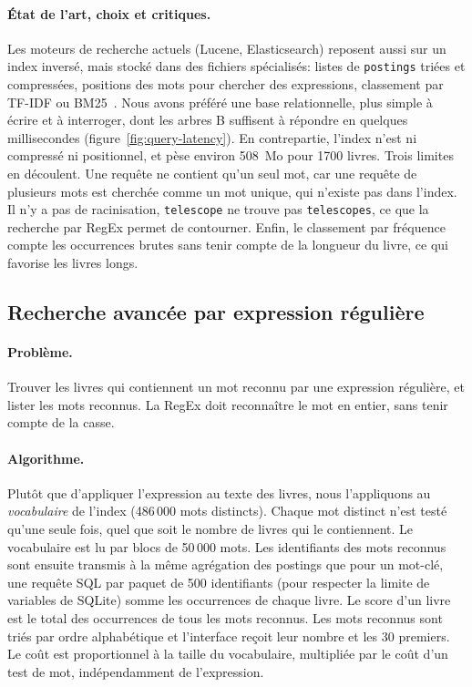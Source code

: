 \documentclass[11pt,a4paper]{article}
\begin{document}
\paragraph{État de l'art, choix et critiques.}
Les moteurs de recherche actuels (Lucene, Elasticsearch) reposent aussi sur un index inversé, mais stocké dans des fichiers spécialisés: listes de \texttt{postings} triées et compressées, positions des mots pour chercher des expressions, classement par TF-IDF ou BM25~\cite{iir}. Nous avons préféré une base relationnelle, plus simple à écrire et à interroger, dont les arbres B suffisent à répondre en quelques millisecondes (figure~\ref{fig:query-latency}). En contrepartie, l'index n'est ni compressé ni positionnel, et pèse environ 508~Mo pour 1700 livres. Trois limites en découlent. Une requête ne contient qu'un seul mot, car une requête de plusieurs mots est cherchée comme un mot unique, qui n'existe pas dans l'index. Il n'y a pas de racinisation, \texttt{telescope} ne trouve pas \texttt{telescopes}, ce que la recherche par RegEx permet de contourner. Enfin, le classement par fréquence compte les occurrences brutes sans tenir compte de la longueur du livre, ce qui favorise les livres longs.

\subsection{Recherche avancée par expression régulière}

\paragraph{Problème.}
Trouver les livres qui contiennent un mot reconnu par une expression régulière, et lister les mots reconnus. La RegEx doit reconnaître le mot en entier, sans tenir compte de la casse.

\paragraph{Algorithme.}
Plutôt que d'appliquer l'expression au texte des livres, nous l'appliquons au \emph{vocabulaire} de l'index (486\,000 mots distincts). Chaque mot distinct n'est testé qu'une seule fois, quel que soit le nombre de livres qui le contiennent. Le vocabulaire est lu par blocs de 50\,000 mots. Les identifiants des mots reconnus sont ensuite transmis à la même agrégation des postings que pour un mot-clé, une requête SQL par paquet de 500 identifiants (pour respecter la limite de variables de SQLite) somme les occurrences de chaque livre. Le score d'un livre est le total des occurrences de tous les mots reconnus. Les mots reconnus sont triés par ordre alphabétique et l'interface reçoit leur nombre et les 30 premiers. Le coût est proportionnel à la taille du vocabulaire, multipliée par le coût d'un test de mot, indépendamment de l'expression.
\end{document}
